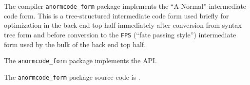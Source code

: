 The compiler {\tt anormcode\_form} package implements the ``A-Normal'' intermediate code 
form.  This is a tree-structured intermediate code form used briefly for optimization 
in the back end top half immediately after conversion from syntax tree form and before 
conversion to the {\tt FPS} (``fate passing style'') intermediate form used 
by the bulk of the back end top half.

The {\tt anormcode\_form} package implements the  API.

The {\tt anormcode\_form} package source code is .



